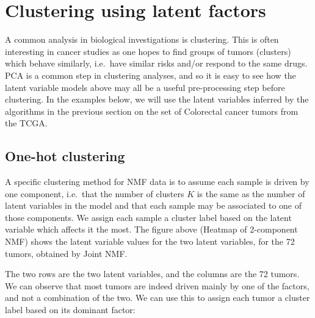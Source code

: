 \documentclass[12pt,]{krantz}
\newenvironment{Shaded}{\begin{snugshade}}{\end{snugshade}}
\newcommand{\DataTypeTok}[1]{\textcolor[rgb]{0.13,0.29,0.53}{#1}}
\newcommand{\KeywordTok}[1]{\textcolor[rgb]{0.13,0.29,0.53}{\textbf{#1}}}
\newcommand{\NormalTok}[1]{#1}
\newcommand{\OperatorTok}[1]{\textcolor[rgb]{0.81,0.36,0.00}{\textbf{#1}}}
\newcommand{\OtherTok}[1]{\textcolor[rgb]{0.56,0.35,0.01}{#1}}
\newcommand{\StringTok}[1]{\textcolor[rgb]{0.31,0.60,0.02}{#1}}
\begin{document}
\hypertarget{clustering-using-latent-factors}{%
\section{Clustering using latent factors}\label{clustering-using-latent-factors}}

A common analysis in biological investigations is clustering. This is often interesting in cancer studies as one hopes to find groups of tumors (clusters) which behave similarly, i.e.~have similar risks and/or respond to the same drugs. PCA is a common step in clustering analyses, and so it is easy to see how the latent variable models above may all be a useful pre-processing step before clustering. In the examples below, we will use the latent variables inferred by the algorithms in the previous section on the set of Colorectal cancer tumors from the TCGA.

\hypertarget{one-hot-clustering}{%
\subsection{One-hot clustering}\label{one-hot-clustering}}

A specific clustering method for NMF data is to assume each sample is driven by one component, i.e.~that the number of clusters \(K\) is the same as the number of latent variables in the model and that each sample may be associated to one of those components. We assign each sample a cluster label based on the latent variable which affects it the most. The figure above (Heatmap of 2-component NMF) shows the latent variable values for the two latent variables, for the 72 tumors, obtained by Joint NMF.

The two rows are the two latent variables, and the columns are the 72 tumors. We can observe that most tumors are indeed driven mainly by one of the factors, and not a combination of the two. We can use this to assign each tumor a cluster label based on its dominant factor:

\begin{Shaded}
\end{Shaded}
\end{document}
